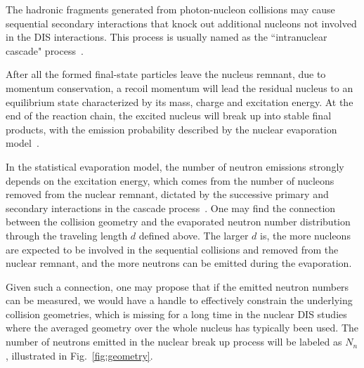 The hadronic fragments generated from photon-nucleon collisions may cause
sequential secondary interactions that knock out additional nucleons
not involved in the DIS interactions. This process is usually named as the
``intranuclear cascade" process~\cite{Bertini:1963zzc}.

After all the formed final-state particles leave the nucleus remnant, due to
momentum conservation, a recoil momentum will lead the residual nucleus to an
equilibrium state characterized by its mass, charge and excitation energy. At the end of the reaction chain, the
excited nucleus will break up into stable final products, with the
emission probability described by the nuclear evaporation model~\cite{Weisskopf:1937zz}. 

In the statistical evaporation model, the number of neutron emissions strongly
depends on the excitation energy, which comes from the number of nucleons removed from
the nuclear remnant, dictated by the successive primary and secondary
interactions in the cascade process~\cite{Ferrari:1995cq}. One may find the
connection between the collision geometry and the evaporated neutron number
distribution through the traveling length $d$ defined above. The larger $d$
is, the more nucleons are expected to be involved in the sequential collisions
and removed from the nuclear remnant, and the more neutrons can be emitted during
the evaporation.


Given such a connection, one may propose that if the emitted
neutron numbers can be measured, we would have a handle to effectively
constrain the underlying collision geometries, which is missing for a long time
in the nuclear DIS studies where the averaged geometry over the whole nucleus
has typically been used. The number of neutrons emitted in the nuclear
break up process will be labeled as $N_{n}$, illustrated in
Fig.~\ref{fig:geometry}.

